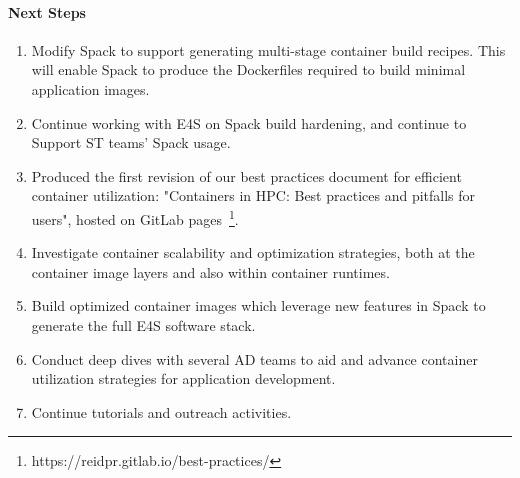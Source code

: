 \paragraph{Next Steps}

\begin{enumerate}
\item Modify Spack to support generating multi-stage container build recipes.
      This will enable Spack to produce the Dockerfiles required to build
      minimal application images.

\item Continue working with E4S on Spack build hardening, and continue to
      Support ST teams' Spack usage.

\item Produced the first revision of our best practices document for
      efficient container utilization: "Containers in HPC: Best practices
      and pitfalls for users", hosted on GitLab
      pages~\footnote{https://reidpr.gitlab.io/best-practices/}.

\item Investigate container scalability and optimization strategies, both
      at the container image layers and also within container runtimes.

\item Build optimized container images which leverage new features in Spack to
      generate the full E4S software stack.

\item Conduct deep dives with several AD teams to aid and advance container
      utilization strategies for application development.

\item Continue tutorials and outreach activities.
\end{enumerate}
